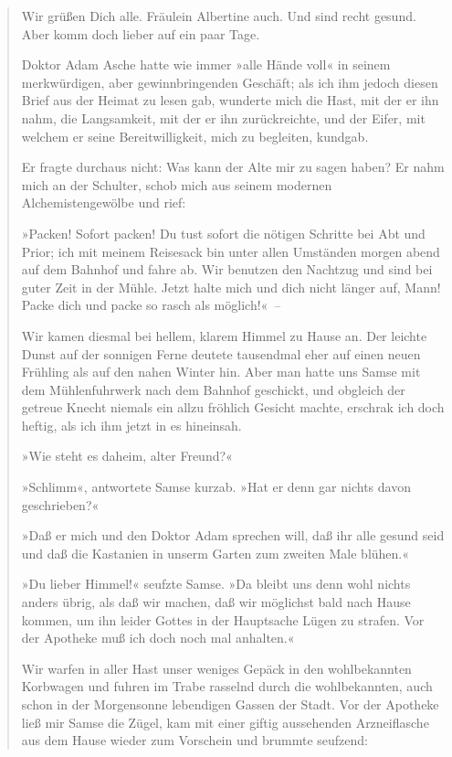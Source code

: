 \begin{verse}
{Wir grüßen Dich alle. Fräulein Albertine auch. Und sind recht
gesund. Aber komm doch lieber auf ein paar Tage.

 }
Doktor Adam Asche hatte wie immer »alle Hände voll« in seinem
merkwürdigen, aber gewinnbringenden Geschäft; als ich ihm jedoch
diesen Brief aus der Heimat zu lesen gab, wunderte mich die Hast,
mit der er ihn nahm, die Langsamkeit, mit der er ihn zurückreichte,
und der Eifer, mit welchem er seine Bereitwilligkeit, mich zu
begleiten, kundgab.

Er fragte durchaus nicht: Was kann der Alte mir zu sagen haben? Er
nahm mich an der Schulter, schob mich aus seinem modernen
Alchemistengewölbe und rief:

»Packen! Sofort packen! Du tust sofort die nötigen Schritte bei Abt
und Prior; ich mit meinem Reisesack bin unter allen Umständen
morgen abend auf dem Bahnhof und fahre ab. Wir benutzen den
Nachtzug und sind bei guter Zeit in der Mühle. Jetzt halte mich und
dich nicht länger auf, Mann! Packe dich und packe so rasch als
möglich!«~–

Wir kamen diesmal bei hellem, klarem Himmel zu Hause an. Der
leichte Dunst auf der sonnigen Ferne deutete tausendmal eher auf
einen neuen Frühling als auf den nahen Winter hin. Aber man hatte
uns Samse mit dem Mühlenfuhrwerk nach dem Bahnhof geschickt, und
obgleich der getreue Knecht niemals ein allzu fröhlich Gesicht
machte, erschrak ich doch heftig, als ich ihm jetzt in es
hineinsah.

»Wie steht es daheim, alter Freund?«

»Schlimm«, antwortete Samse kurzab. »Hat er denn gar nichts davon
geschrieben?«

»Daß er mich und den Doktor Adam sprechen will, daß ihr alle gesund
seid und daß die Kastanien in unserm Garten zum zweiten Male
blühen.«

»Du lieber Himmel!« seufzte Samse. »Da bleibt uns denn wohl nichts
anders übrig, als daß wir machen, daß wir möglichst bald nach Hause
kommen, um ihn leider Gottes in der Hauptsache Lügen zu strafen.
Vor der Apotheke muß ich doch noch mal anhalten.«

Wir warfen in aller Hast unser weniges Gepäck in den wohlbekannten
Korbwagen und fuhren im Trabe rasselnd durch die wohlbekannten,
auch schon in der Morgensonne lebendigen Gassen der Stadt. Vor der
Apotheke ließ mir Samse die Zügel, kam mit einer giftig aussehenden
Arzneiflasche aus dem Hause wieder zum Vorschein und brummte
seufzend:


\end{verse}

